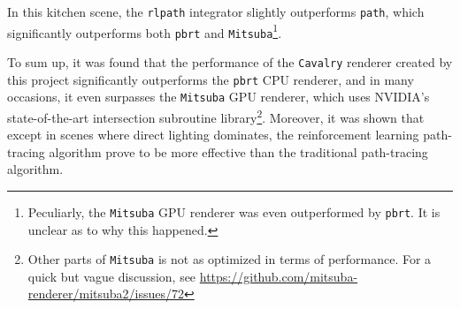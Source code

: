 In this kitchen scene, the \texttt{rlpath} integrator slightly outperforms \texttt{path}, which significantly outperforms both \texttt{pbrt} and \texttt{Mitsuba}\footnote{Peculiarly, the \texttt{Mitsuba} GPU renderer was even outperformed by \texttt{pbrt}. It is unclear as to why this happened.}. 

\newpage

To sum up, it was found that the performance of the \texttt{Cavalry} renderer created by this project significantly outperforms the \texttt{pbrt} CPU renderer, and in many occasions, it even surpasses the \texttt{Mitsuba} GPU renderer, which uses NVIDIA's state-of-the-art intersection subroutine library\footnote{Other parts of \texttt{Mitsuba} is not as optimized in terms of performance. For a quick but vague discussion, see \url{https://github.com/mitsuba-renderer/mitsuba2/issues/72}}. Moreover, it was shown that except in scenes where direct lighting dominates, the reinforcement learning path-tracing algorithm prove to be more effective than the traditional path-tracing algorithm.